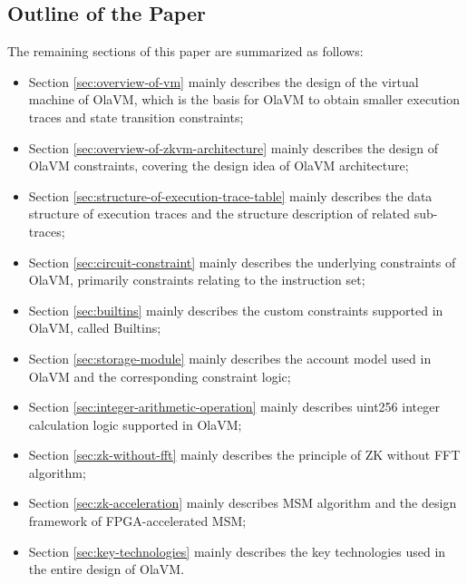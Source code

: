 \subsection{Outline of the Paper}

The remaining sections of this paper are summarized as follows:
\begin{itemize}
    \item Section \ref{sec:overview-of-vm} mainly describes the design of the virtual machine of OlaVM, which is the basis for OlaVM to obtain smaller execution traces and state transition constraints;
    \item Section \ref{sec:overview-of-zkvm-architecture} mainly describes the design of OlaVM constraints, covering the design idea of OlaVM architecture;
    \item Section \ref{sec:structure-of-execution-trace-table} mainly describes the data structure of execution traces and the structure description of related sub-traces;
    \item Section \ref{sec:circuit-constraint} mainly describes the underlying constraints of OlaVM, primarily constraints relating to the instruction set;
    \item Section \ref{sec:builtins} mainly describes the custom constraints supported in OlaVM, called Builtins;
    \item Section \ref{sec:storage-module} mainly describes the account model used in OlaVM and the corresponding constraint logic;
    \item Section \ref{sec:integer-arithmetic-operation} mainly describes uint256 integer calculation logic supported in OlaVM;
    \item Section \ref{sec:zk-without-fft} mainly describes the principle of ZK without FFT algorithm;
    \item Section \ref{sec:zk-acceleration} mainly describes MSM algorithm and the design framework of FPGA-accelerated MSM;
    \item Section \ref{sec:key-technologies} mainly describes the key technologies used in the entire design of OlaVM.
\end{itemize}
